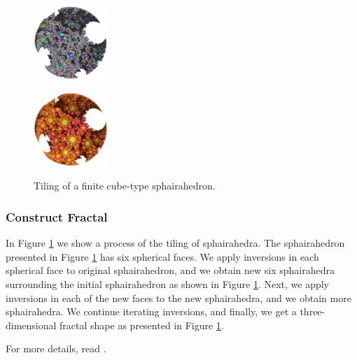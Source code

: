 \begin{figure}[H]
\begin{minipage}[t]{0.19\textwidth}
  \label{fig:sphaira-step5}
 \end{minipage}
 \hspace*{\fill}
 \begin{minipage}[t]{0.19\textwidth}
  \centering
  \includegraphics[width=1.1in, height=1.1in, keepaspectratio]{./img/application/sphairahedron/finiteProcess/step10.png}
  \label{fig:sphaira-step10}
 \end{minipage}
 \hspace*{\fill}
 \begin{minipage}[t]{0.19\textwidth}
  \centering
  \includegraphics[width=1.1in, height=1.1in, keepaspectratio]{./img/application/sphairahedron/finiteProcess/final.png}
  \label{fig:sphaira-final}
 \end{minipage}
 \hspace*{\fill}
 \caption{Tiling of a finite cube-type sphairahedron.}
 \label{fig:sphairahedronTile}
\end{figure}

\subsubsection{Construct Fractal}

In Figure \ref{fig:sphairahedronTile} we show a process of the tiling of
sphairahedra.
The sphairahedron presented in Figure
\ref{fig:sphairahedronTile} has six spherical
faces.
We apply inversions in each spherical face to original sphairahedron,
and we obtain new six sphairahedra surrounding the initial sphairahedron
as shown in Figure
\ref{fig:sphairahedronTile}.
Next, we apply inversions in each of the new faces to the new sphairahedra,
and we obtain more sphairahedra.
We continue iterating inversions, and finally, we get a three-dimensional
fractal shape as presented in Figure \ref{fig:sphairahedronTile}.

For more details, read \cite{bridges2018:171}.

